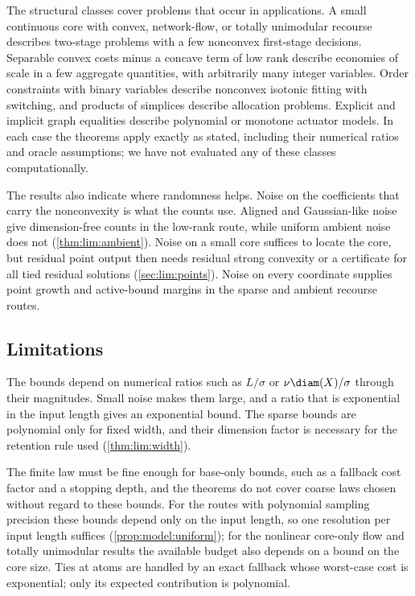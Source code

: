 The structural classes cover problems that occur in applications. A small
continuous core with convex, network-flow, or totally unimodular recourse
describes two-stage problems with a few nonconvex first-stage decisions.
Separable convex costs minus a concave term of low rank describe economies
of scale in a few aggregate quantities, with arbitrarily many integer
variables. Order constraints with binary variables describe nonconvex
isotonic fitting with switching, and products of simplices describe
allocation problems. Explicit and implicit graph equalities describe
polynomial or monotone actuator models. In each case the theorems apply
exactly as stated, including their numerical ratios and oracle assumptions;
we have not evaluated any of these classes computationally.

The results also indicate where randomness helps. Noise on the coefficients
that carry the nonconvexity is what the counts use. Aligned and Gaussian-like
noise give dimension-free counts in the low-rank route, while uniform ambient
noise does not (\cref{thm:lim:ambient}). Noise on a small core suffices to
locate the core, but residual point output then needs residual strong
convexity or a certificate for all tied residual solutions
(\cref{sec:lim:points}). Noise on every coordinate supplies point growth and
active-bound margins in the sparse and ambient recourse routes.

\subsection{Limitations}\label{sec:disc:limits}

The bounds depend on numerical ratios such as $L/\sigma$ or
$\nu\diam(X)/\sigma$ through their magnitudes. Small noise makes them large,
and a ratio that is exponential in the input length gives an exponential
bound. The sparse bounds are polynomial only for fixed width, and their
dimension factor is necessary for the retention rule used
(\cref{thm:lim:width}).

The finite law must be fine enough for base-only bounds, such as a fallback
cost factor and a stopping depth, and the theorems do not cover coarse laws
chosen without regard to these bounds. For the routes with polynomial
sampling precision these bounds depend only on the input length, so one
resolution per input length suffices (\cref{prop:model:uniform}); for the
nonlinear core-only flow and totally unimodular results the available budget
also depends on a bound on the core size. Ties at atoms are handled by an
exact fallback whose worst-case cost is exponential; only its expected
contribution is polynomial.

